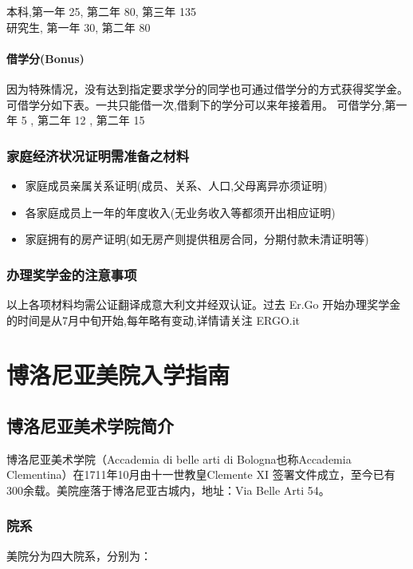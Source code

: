 \documentclass[3pt,a5paper,openright,twoside]{book}
\begin{document}
本科,第一年  25, 第二年  80, 第三年   135\\
研究生, 第一年 30, 第二年 80 


\subsubsection{借学分(Bonus)}
因为特殊情况，没有达到指定要求学分的同学也可通过借学分的方式获得奖学金。可借学分如下表。一共只能借一次,借剩下的学分可以来年接着用。 可借学分,第一年  5 , 第二年  12 , 第二年   15  
  

\subsection{家庭经济状况证明需准备之材料}
\begin{itemize}
 \item 家庭成员亲属关系证明(成员、关系、人口,父母离异亦须证明)
 \item 各家庭成员上一年的年度收入(无业务收入等都须开出相应证明) 
 \item 家庭拥有的房产证明(如无房产则提供租房合同，分期付款未清证明等)
\end{itemize} 

\subsection{办理奖学金的注意事项}
以上各项材料均需公证翻译成意大利文并经双认证。过去 Er.Go 开始办理奖学金的时间是从7月中旬开始,每年略有变动,详情请关注 ERGO.it
% 
%
%
%

\chapter{博洛尼亚美院入学指南}              


\section{博洛尼亚美术学院简介}
博洛尼亚美术学院（Accademia di belle arti di Bologna也称Accademia Clementina）在1711年10月由十一世教皇Clemente XI 签署文件成立，至今已有300余载。美院座落于博洛尼亚古城内，地址：Via Belle Arti 54。

\subsection{院系}
美院分为四大院系，分别为：
\end{document}
